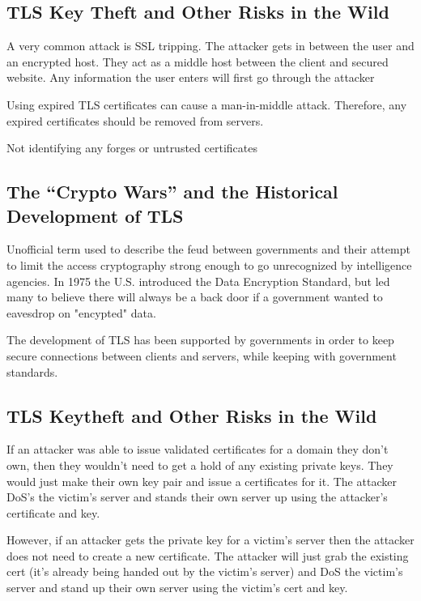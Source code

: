 \documentclass[11pt]{article} %
\begin{document}
\subsection{TLS Key Theft and Other Risks in the Wild}
{\parindent0pt A very common attack is SSL tripping. The attacker gets in 
between the user and an encrypted host. They act as a middle host between the 
client and secured website. Any information the user enters will first go 
through the attacker}

\bigskip
{\parindent0pt Using expired TLS certificates can cause a man-in-middle attack.
Therefore, any expired certificates should be removed from servers.}

\bigskip
{\parindent0pt Not identifying any forges or untrusted certificates}

\subsection{The “Crypto Wars” and the Historical Development of TLS}
{\parindent0pt Unofficial term used to describe the feud between governments 
and their attempt to limit the access cryptography strong enough to go 
unrecognized by intelligence agencies. In 1975 the U.S. introduced the Data 
Encryption Standard, but led many to believe there will always be a back door 
if a government wanted to eavesdrop on "encypted" data.}

\bigskip
{\parindent0pt The development of TLS has been supported by governments in 
order to keep secure connections between clients and servers, while keeping 
with government standards.}

\subsection{TLS Keytheft and Other Risks in the Wild}
{\parindent0pt If an attacker was able to issue validated certificates for a 
domain they don’t own, then they wouldn’t need to get a hold of any existing 
private keys. They would just make their own key pair and issue a certificates 
for it. The attacker DoS’s the victim’s server and stands their own server up 
using the attacker’s certificate and key.}

\bigskip
{\parindent0pt However, if an attacker gets the private key for a victim’s 
server then the attacker does not need to create a new certificate. The attacker
will just grab the existing cert (it’s already being handed out by the victim’s
server) and DoS the victim’s server and stand up their own server using the 
victim’s cert and key.}
\end{document}

